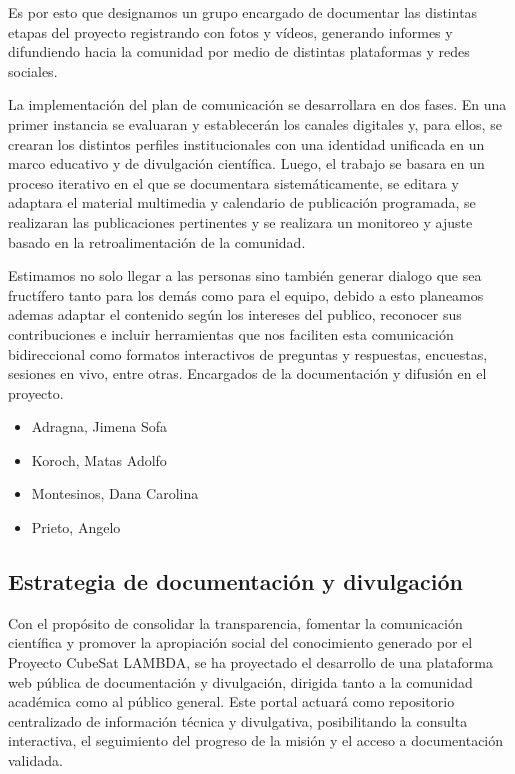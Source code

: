 \begin{itemize}
          Es por esto que designamos un grupo encargado de documentar las distintas etapas
          del proyecto registrando con fotos y vídeos, generando informes y difundiendo hacia la
          comunidad por medio de distintas plataformas y redes sociales.

          La implementación del plan de comunicación se desarrollara en dos fases. En una primer
          instancia se evaluaran y establecerán los canales digitales y, para ellos, se crearan los
          distintos perfiles institucionales con una identidad unificada en un marco educativo
          y de divulgación científica. Luego, el trabajo se basara en un proceso iterativo en el
          que se documentara sistemáticamente, se editara y adaptara el material multimedia y
          calendario de publicación programada, se realizaran las publicaciones pertinentes y se
          realizara un monitoreo y ajuste basado en la retroalimentación de la comunidad.

          Estimamos no solo llegar a las personas sino también generar dialogo que sea fructífero
          tanto para los demás como para el equipo, debido a esto planeamos ademas adaptar el
          contenido según los intereses del publico, reconocer sus contribuciones e incluir
          herramientas que nos faciliten esta comunicación bidireccional como formatos interactivos
          de preguntas y respuestas, encuestas, sesiones en vivo, entre otras.
          Encargados de la documentación y difusión en el proyecto.
          \begin{itemize}
            \item Adragna, Jimena Sofa
            \item Koroch, Matas Adolfo
            \item Montesinos, Dana Carolina
            \item Prieto, Angelo
          \end{itemize}
      \end{itemize}

  \subsection{Estrategia de documentación y divulgación}

    Con el propósito de consolidar la transparencia, fomentar la comunicación científica y
    promover la apropiación social del conocimiento generado por el Proyecto CubeSat LAMBDA, se ha
    proyectado el desarrollo de una plataforma web pública de documentación y divulgación, dirigida
    tanto a la comunidad académica como al público general. Este portal actuará como repositorio
    centralizado de información técnica y divulgativa, posibilitando la consulta interactiva, el
    seguimiento del progreso de la misión y el acceso a documentación validada.

